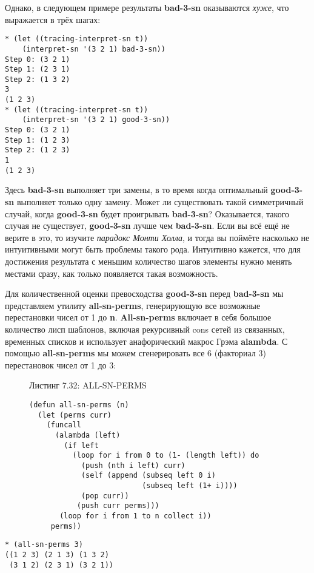 Однако, в следующем примере результаты \textbf{bad-3-sn} оказываются \emph{хуже}, что выражается в трёх шагах:

\begin{verbatim}
* (let ((tracing-interpret-sn t))
    (interpret-sn '(3 2 1) bad-3-sn))
Step 0: (3 2 1)
Step 1: (2 3 1)
Step 2: (1 3 2)
3
(1 2 3)
* (let ((tracing-interpret-sn t))
    (interpret-sn '(3 2 1) good-3-sn))
Step 0: (3 2 1)
Step 1: (1 2 3)
Step 2: (1 2 3)
1
(1 2 3)
\end{verbatim}

Здесь \textbf{bad-3-sn} выполняет три замены, в то время когда оптимальный \textbf{good-3-sn} выполняет только одну замену. Может ли существовать такой симметричный случай, когда \textbf{good-3-sn} будет проигрывать \textbf{bad-3-sn}? Оказывается, такого случая не существует, \textbf{good-3-sn} лучше чем \textbf{bad-3-sn}. Если вы всё ещё не верите в это, то изучите \emph{парадокс Монти Холла}, и тогда вы поймёте насколько не интуитивными могут быть проблемы такого рода. Интуитивно кажется, что для достижения результата с меньшим количество шагов элементы нужно менять местами сразу, как только появляется такая возможность.

Для количественной оценки превосходства \textbf{good-3-sn} перед \textbf{bad-3-sn} мы представляем утилиту \textbf{all-sn-perms}, генерирующую все возможные перестановки чисел от 1 до \textbf{n}. \textbf{All-sn-perms} включает в себя большое количество лисп шаблонов, включая рекурсивный cons сетей из связанных, временных списков и использует анафорический макрос Грэма \textbf{alambda}. С помощью \textbf{all-sn-perms} мы можем сгенерировать все 6 (факториал 3) перестановок чисел от 1 до 3:

\begin{figure}Листинг 7.32: ALL-SN-PERMS\label{listing_7.32}
\listbegin
\begin{verbatim}
(defun all-sn-perms (n)
  (let (perms curr)
    (funcall
      (alambda (left)
        (if left
          (loop for i from 0 to (1- (length left)) do
            (push (nth i left) curr)
            (self (append (subseq left 0 i)
                          (subseq left (1+ i))))
            (pop curr))
           (push curr perms)))
       (loop for i from 1 to n collect i))
     perms))
\end{verbatim}
\listend
\end{figure}

\begin{verbatim}
* (all-sn-perms 3)
((1 2 3) (2 1 3) (1 3 2)
 (3 1 2) (2 3 1) (3 2 1))
\end{verbatim}

